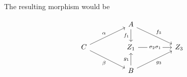 The resulting morphism would be

\[\begin{tikzcd}
	&& A \\
	C && {Z_1} && {Z_3} \\
	&& B
	\arrow["{f_1}"', from=1-3, to=2-3]
	\arrow["{f_3}", from=1-3, to=2-5]
	\arrow["\alpha", from=2-1, to=1-3]
	\arrow["\beta"', from=2-1, to=3-3]
	\arrow["{\sigma_2 \sigma_1}"{description}, from=2-3, to=2-5]
	\arrow["{g_1}", from=3-3, to=2-3]
	\arrow["{g_3}"', from=3-3, to=2-5]
\end{tikzcd}\]
